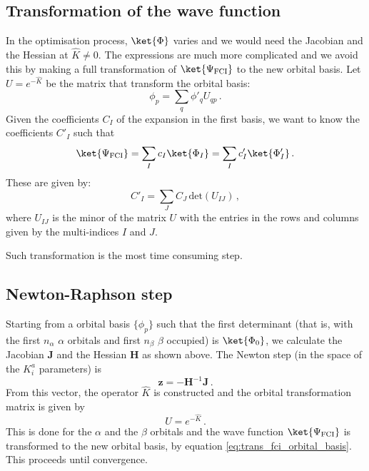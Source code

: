 \documentclass[a4paper,11pt]{article}
\begin{document}
\subsection{Transformation of the wave function}
In the optimisation process, $\ket{\Phi}$ varies and we would need the Jacobian and the Hessian at $\hat{K} \ne 0$.
The expressions are much more complicated and we avoid this by making a full transformation of $\ket{\Psi_\text{FCI}}$ to the new orbital basis.
Let $U = e^{-\hat{K}}$ be the matrix that transform the orbital basis:
\begin{equation}
  \phi_p = \sum_q \phi'_q U_{qp}\,.
\end{equation}
Given the coefficients $C_I$ of the expansion in the first basis, we want to know the coefficients $C'_I$ such that
\begin{equation}
  \ket{\Psi_\text{FCI}} = \sum_I c_I \ket{\Phi_I} = \sum_I c'_I \ket{\Phi'_I}\,.
\end{equation}
These are given by:
\begin{equation}\label{eq:trans_fci_orbital_basis}
  C'_I = \sum_J C_J\, \text{det}(U_{IJ})\,,
\end{equation}
where $U_{IJ}$ is the minor of the matrix $U$ with the entries in the rows and columns given by the multi-indices $I$ and $J$.

Such transformation is the most time consuming step.


\subsection{Newton-Raphson step}
Starting from a orbital basis $\{\phi_p\}$ such that the first determinant (that is, with the first $n_\alpha$ $\alpha$ orbitals and first $n_\beta$ $\beta$ occupied) is $\ket{\Phi_0}$, we calculate the Jacobian $\mathbf{J}$ and the Hessian $\mathbf{H}$ as shown above.
The Newton step (in the space of the $K_i^a$ parameters) is
\begin{equation}
  \mathbf{z} = -\mathbf{H}^{-1} \mathbf{J}\,.
\end{equation}
From this vector, the operator $\hat{K}$ is constructed and the orbital transformation matrix is given by
\begin{equation}
  U = e^{-\hat{K}}\,.
\end{equation}
This is done for the $\alpha$ and the $\beta$ orbitals and the wave function $\ket{\Psi_\text{FCI}}$ is transformed to the new orbital basis, by equation \ref{eq:trans_fci_orbital_basis}.
This proceeds until convergence.
\end{document}
